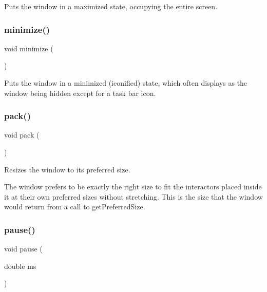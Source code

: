 Puts the window in a maximized state, occupying the entire screen. 

\mbox{\label{classGWindow_a85ffaebe489c0ecf8051715ecf59babb}} 
\subsubsection{\texorpdfstring{minimize()}{minimize()}}
{\footnotesize\ttfamily void minimize (\begin{DoxyParamCaption}{ }\end{DoxyParamCaption})\hspace{0.3cm}{\ttfamily [virtual]}}



Puts the window in a minimized (iconified) state, which often displays as the window being hidden except for a task bar icon. 

\mbox{\label{classGWindow_a915ffc82b17862ab1d2a466a79d23a3f}} 
\subsubsection{\texorpdfstring{pack()}{pack()}}
{\footnotesize\ttfamily void pack (\begin{DoxyParamCaption}{ }\end{DoxyParamCaption})\hspace{0.3cm}{\ttfamily [virtual]}}



Resizes the window to its preferred size. 

The window prefers to be exactly the right size to fit the interactors placed inside it at their own preferred sizes without stretching. This is the size that the window would return from a call to get\+Preferred\+Size. \mbox{\label{classGWindow_adc7d99bb2dc43b8337e89b7d54cab9d3}} 
\subsubsection{\texorpdfstring{pause()}{pause()}}
{\footnotesize\ttfamily void pause (\begin{DoxyParamCaption}\item[{double}]{ms }\end{DoxyParamCaption})\hspace{0.3cm}{\ttfamily [virtual]}}



